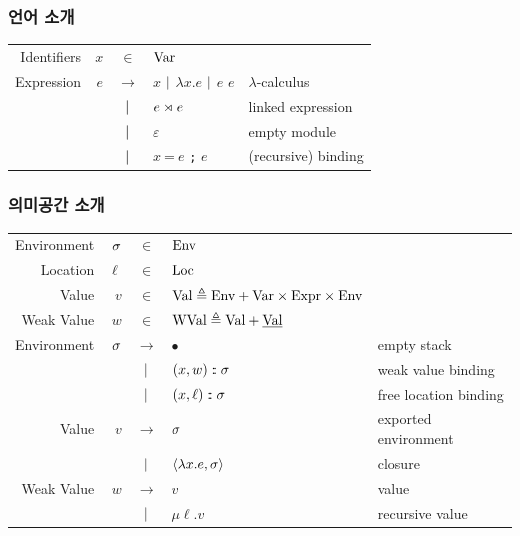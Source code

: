 \documentclass{beamer}
\begin{document}
\begin{frame}[c,fragile]
	\frametitle{언어 소개}
	{
		\small
		\begin{tabular}{rrcll}
			Identifiers & $x$ & $\in$         & $\text{Var}$                                                      \\
			Expression  & $e$ & $\rightarrow$ & $x$ $|$ $\lambda x.e$ $|$ $e$ $e$ & $\lambda$-calculus  \\
			            &     & $|$       & $e\rtimes e$                             & linked expression   \\
			            &     & $|$       & $\varepsilon$                             & empty module        \\
			            &     & $|$       & $x\:\texttt{=}\:e$ \texttt{;} $e$         & (recursive) binding
		\end{tabular}
	}
\end{frame}
\begin{frame}[c,fragile]
	\frametitle{의미공간 소개}
	{
		\small
		\begin{tabular}{rrcll}
			Environment & $\sigma$ & $\in$         & $\text{Env}$                                                                        \\
			Location    & $\ell$ & $\in$         & $\text{Loc}$                                                                        \\
			Value       & $v$    & $\in$         & $\text{Val} \triangleq\text{Env}+\text{Var}\times\text{Expr}\times\text{Env}$                         \\
			Weak Value  & $w$    & $\in$         & $\text{WVal}\triangleq\text{Val}+\underline{\text{Val}}$                                     \\
			Environment & $\sigma$ & $\rightarrow$ & $\bullet$                                             & empty stack           \\
			            &        & $|$       & $(x,w):\mkern-3mu: \sigma$                                     & weak value binding    \\
			            &        & $|$       & $(x,\ell):\mkern-3mu:\sigma$                                   & free location binding \\
			Value       & $v$    & $\rightarrow$ & $\sigma$                                                & exported environment  \\
			            &        & $|$       & $\langle \lambda x.e, \sigma \rangle$                   & closure               \\
			Weak Value  & $w$    & $\rightarrow$ & $v$                                                   & value                 \\
			            &        & $|$       & $\mu\ell.v$                                           & recursive value
		\end{tabular}
	}
\end{frame}
\end{document}
